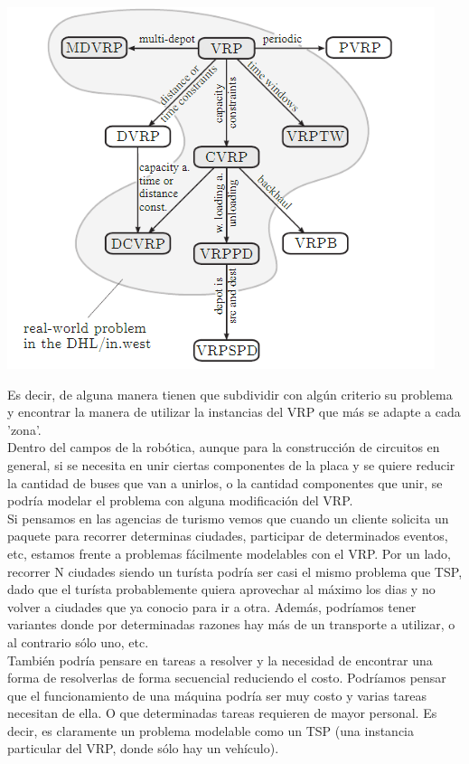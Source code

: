 \documentclass[11pt,a4paper]{article}
\begin{document}
\begin{center}
\includegraphics[scale=.8]{graficos/img1.png}
\end{center}

Es decir, de alguna manera tienen que subdividir con algún criterio su problema y encontrar la manera de utilizar la instancias del VRP que más se adapte a cada 'zona'.\\


Dentro del campos de la robótica, aunque para la construcción de circuitos en general, si se necesita en unir ciertas componentes de la placa y se quiere reducir la cantidad de buses que van a unirlos, o la cantidad componentes que unir, se podría modelar el problema con alguna modificación del VRP.\\

Si pensamos en las agencias de turismo vemos que cuando un cliente solicita un paquete para recorrer determinas ciudades, participar de determinados eventos, etc, estamos frente a problemas fácilmente modelables con el VRP. Por un lado, recorrer N ciudades siendo un turísta podría ser casi el mismo problema que TSP, dado que el turísta probablemente quiera aprovechar al máximo los dias y no volver a ciudades que ya conocio para ir a otra. Además, podríamos tener variantes donde por determinadas razones hay más de un transporte a utilizar, o al contrario sólo uno, etc. \\

También podría pensare en tareas a resolver y la necesidad de encontrar una forma de resolverlas de forma secuencial reduciendo el costo. Podríamos pensar que el funcionamiento de una máquina podría ser muy costo y varias tareas necesitan de ella. O que determinadas tareas requieren de mayor personal. Es decir, es claramente un problema modelable como un TSP (una instancia particular del VRP, donde sólo hay un vehículo).	\\
\end{document}
